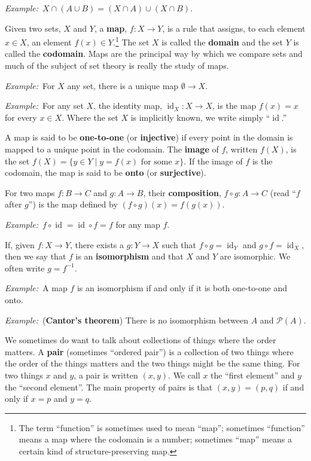 \documentclass[10pt, a4paper, twocolumn]{article}
\newcommand{\defn}[1]{\textbf{#1}}
\newcommand{\eg}{\emph{Example:}\relax}
\DeclareMathOperator{\id}{id}
\begin{document}
\eg\ $X\cap(A\cup B) = (X\cap A)\cup (X\cap B)$.

Given two sets, $X$ and $Y$, a \defn{map}, $f : X \to Y$, is a rule that assigns,
to each element $x \in X$, an element $f(x) \in Y$.\footnote{The term “function” is
  sometimes used to mean “map”; sometimes “function” means a map where the
  codomain is a number; sometimes “map” means a certain kind of
  structure-preserving map.} The set $X$ is called the \defn{domain} and the set
$Y$ is called the \defn{codomain}. Maps are the principal way by which we
compare sets and much of the subject of set theory is really the study of maps.

\eg\ For $X$ any set, there is a unique map $\emptyset \to X$.

\eg\ For any set $X$, the
identity map, $\id_X : X \to X$, is the map $f(x) = x$ for every
$x\in X$. Where the set $X$ is implicitly known, we write simply “$\id$.” 

A map is said to be \defn{one-to-one} (or \defn{injective}) if every point in
the domain is mapped to a unique point in the codomain. The \defn{image} of $f$,
written $f(X)$, is the set $f(X) = \{y \in Y \mid \text{$y = f(x)$ for some
  $x$}\}$. If the image of $f$ is the codomain, the map is said to be \defn{onto} (or \defn{surjective}). 

For two maps $f:B \to C$ and $g:A \to B$, their \defn{composition}, $f\circ g: A \to C$
(read “$f$ after $g$”) is the map defined by $(f\circ g)(x) = f(g(x))$.

\eg\ $f\circ\id = \id\circ f = f$ for any map $f$. 

If, given $f:X \to Y$, there exists a $g:Y \to X$ such that $f\circ g = \id_Y$ and $g\circ f
= \id_X$, then we say that $f$ is an \defn{isomorphism} and that $X$ and $Y$ are
isomorphic. We often write $g = f^{-1}$.

\eg\ A map $f$ is an isomorphism if and only if it is both one-to-one and onto. 

\eg\ (\defn{Cantor's theorem}) There is no isomorphism between $A$ and $\mathcal{P}(A)$. 

We sometimes do want to talk about collections of things where the order
matters. A \defn{pair} (sometimes “ordered pair”) is a collection of two things
where the order of the things matters and the two things might be the same
thing. For two things $x$ and $y$, a pair is written $(x, y)$. We call $x$ the
“first element” and $y$ the “second element”. The main property of pairs is that
$(x,y)=(p,q)$ if and only if $x=p$ and $y=q$.
\end{document}
